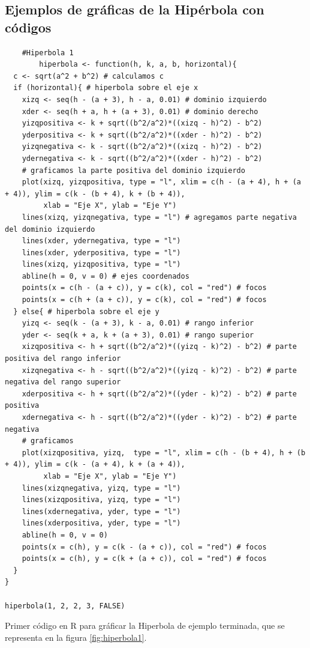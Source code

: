 \documentclass[12pt,a4paper]{article}
\begin{document}
\subsection{Ejemplos de gráficas de la Hipérbola con códigos} \label{subsec:EH}

\begin{table}[htpb]
	\begin{lstlisting}
	#Hiperbola 1		
		hiperbola <- function(h, k, a, b, horizontal){
  c <- sqrt(a^2 + b^2) # calculamos c
  if (horizontal){ # hiperbola sobre el eje x
    xizq <- seq(h - (a + 3), h - a, 0.01) # dominio izquierdo
    xder <- seq(h + a, h + (a + 3), 0.01) # dominio derecho
    yizqpositiva <- k + sqrt((b^2/a^2)*((xizq - h)^2) - b^2) 
    yderpositiva <- k + sqrt((b^2/a^2)*((xder - h)^2) - b^2) 
    yizqnegativa <- k - sqrt((b^2/a^2)*((xizq - h)^2) - b^2) 
    ydernegativa <- k - sqrt((b^2/a^2)*((xder - h)^2) - b^2) 
    # graficamos la parte positiva del dominio izquierdo
    plot(xizq, yizqpositiva, type = "l", xlim = c(h - (a + 4), h + (a + 4)), ylim = c(k - (b + 4), k + (b + 4)),
         xlab = "Eje X", ylab = "Eje Y")
    lines(xizq, yizqnegativa, type = "l") # agregamos parte negativa del dominio izquierdo
    lines(xder, ydernegativa, type = "l")
    lines(xder, yderpositiva, type = "l")
    lines(xizq, yizqpositiva, type = "l")
    abline(h = 0, v = 0) # ejes coordenados
    points(x = c(h - (a + c)), y = c(k), col = "red") # focos
    points(x = c(h + (a + c)), y = c(k), col = "red") # focos
  } else{ # hiperbola sobre el eje y
    yizq <- seq(k - (a + 3), k - a, 0.01) # rango inferior
    yder <- seq(k + a, k + (a + 3), 0.01) # rango superior
    xizqpositiva <- h + sqrt((b^2/a^2)*((yizq - k)^2) - b^2) # parte positiva del rango inferior
    xizqnegativa <- h - sqrt((b^2/a^2)*((yizq - k)^2) - b^2) # parte negativa del rango superior
    xderpositiva <- h + sqrt((b^2/a^2)*((yder - k)^2) - b^2) # parte positiva
    xdernegativa <- h - sqrt((b^2/a^2)*((yder - k)^2) - b^2) # parte negativa
    # graficamos
    plot(xizqpositiva, yizq,  type = "l", xlim = c(h - (b + 4), h + (b + 4)), ylim = c(k - (a + 4), k + (a + 4)),
         xlab = "Eje X", ylab = "Eje Y")
    lines(xizqnegativa, yizq, type = "l")
    lines(xizqpositiva, yizq, type = "l")
    lines(xdernegativa, yder, type = "l")
    lines(xderpositiva, yder, type = "l")
    abline(h = 0, v = 0)
    points(x = c(h), y = c(k - (a + c)), col = "red") # focos
    points(x = c(h), y = c(k + (a + c)), col = "red") # focos
  }
}

hiperbola(1, 2, 2, 3, FALSE)
	\end{lstlisting}
	\caption{Primer código en R para gráficar la Hiperbola de ejemplo terminada, que se representa en la figura \ref{fig:hiperbola1}.}
	\label{alg:recta1}
\end{table}
\end{document}
